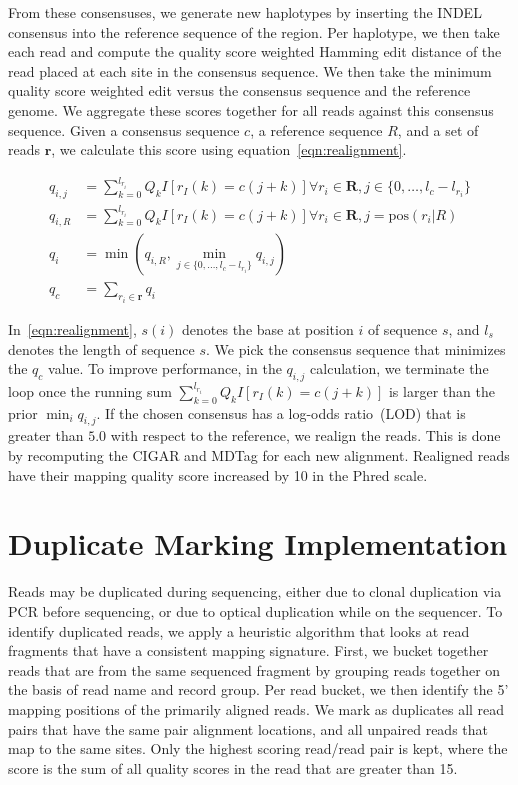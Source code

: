 \documentclass[phd]{ucbthesis}
\begin{document}
From these consensuses, we generate new haplotypes by inserting the INDEL consensus into the reference
sequence of the region. Per haplotype, we then take each read and compute the quality score weighted Hamming
edit distance of the read placed at each site in the consensus sequence. We then take the minimum quality
score weighted edit versus the consensus sequence and the reference genome. We aggregate these scores
together for all reads against this consensus sequence. Given a consensus sequence $c$, a reference sequence $R$,
and a set of reads $\mathbf{r}$, we calculate this score using equation~\eqref{eqn:realignment}.

\begin{align}
\label{eqn:realignment}
q_{i, j} &= \sum_{k = 0}^{l_{r_i}} Q_k I[r_I(k) = c(j + k)] \forall r_i \in \mathbf{R}, j \in \{0, \dots, l_c - l_{r_i}\}  \\
q_{i, R} &= \sum_{k = 0}^{l_{r_i}} Q_k I[r_I(k) = c(j + k)] \forall r_i \in \mathbf{R}, j = \text{pos}(r_i | R) \\
q_i &= \min(q_{i, R}, \min_{j \in \{0, \dots, l_c - l_{r_i}\}} q_{i, j}) \\
q_c &= \sum_{r_i \in \mathbf{r}} q_i
\end{align}

In~\eqref{eqn:realignment}, $s(i)$ denotes the base at position $i$ of sequence
$s$, and $l_s$ denotes the length of sequence $s$. We pick the consensus
sequence that minimizes the $q_c$ value. To improve performance, in the
$q_{i, j}$ calculation, we terminate the loop once the running sum
$\sum_{k = 0}^{l_{r_i}} Q_k I[r_I(k) = c(j + k)]$ is larger than the prior
$\min_i q_{i, j}$. If the chosen consensus has a log-odds ratio~(LOD)
that is greater than $5.0$ with respect to the reference, we realign the reads.
This is done by recomputing the CIGAR and MDTag for each new alignment.
Realigned reads have their mapping quality score increased by 10 in the Phred
scale.

\section{Duplicate Marking Implementation}
\label{sec:duplicate-marking-implementation}

Reads may be duplicated during sequencing, either due to clonal duplication via PCR before sequencing, or
due to optical duplication while on the sequencer. To identify duplicated reads, we apply a heuristic algorithm
that looks at read fragments that have a consistent mapping signature. First, we bucket together reads that
are from the same sequenced fragment by grouping reads together on the basis of read name and record group.
Per read bucket, we then identify the 5' mapping positions of the primarily aligned reads.
We mark as duplicates all read pairs that have the same pair alignment locations, and all unpaired reads that
map to the same sites. Only the highest scoring read/read pair is kept, where the score is the sum of all quality
scores in the read that are greater than 15.
\end{document}
